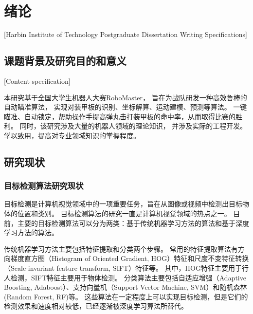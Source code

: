 
\chapter[绪论]{绪论}[Harbin Institute of Technology Postgraduate Dissertation Writing Specifications]

\section{课题背景及研究目的和意义}[Content specification]

本研究基于全国大学生机器人大赛RoboMaster，
旨在为战队研发一种高效鲁棒的自动瞄准算法，
实现对装甲板的识别、坐标解算、运动建模、预测等算法。
一键瞄准、自动锁定，帮助操作手提高弹丸击打装甲板的命中率，从而取得比赛的胜利。
同时，该研究涉及大量的机器人领域的理论知识，
并涉及实际的工程开发。学以致用，提高对专业领域知识的掌握程度。

\section{研究现状}

\subsection{目标检测算法研究现状}
目标检测是计算机视觉领域中的一项重要任务，旨在从图像或视频中检测出目标物体的位置和类别。
目标检测算法的研究一直是计算机视觉领域的热点之一。
目前，主要的目标检测算法可以分为两类：基于传统机器学习方法的算法和基于深度学习方法的算法。\par


传统机器学习方法主要包括特征提取和分类两个步骤。
常用的特征提取算法有方向梯度直方图（Histogram of Oriented Gradient, HOG）特征\cite{pang2011efficient}和尺度不变特征转换（Scale-invariant feature transform, SIFT）特征\cite{ng2003sift}等。
其中，HOG特征主要用于行人检测，SIFT特征主要用于物体检测。
分类算法主要包括自适应增强（Adaptive Boosting, Adaboost）\cite{hastie2009multi}、支持向量机（Support Vector Machine, SVM）\cite{schuldt2004recognizing}和随机森林(Random Forest, RF)\cite{biau2016random}等。
这些算法在一定程度上可以实现目标检测，但是它们的检测效果和速度相对较低，已经逐渐被深度学习算法所替代。

\par


